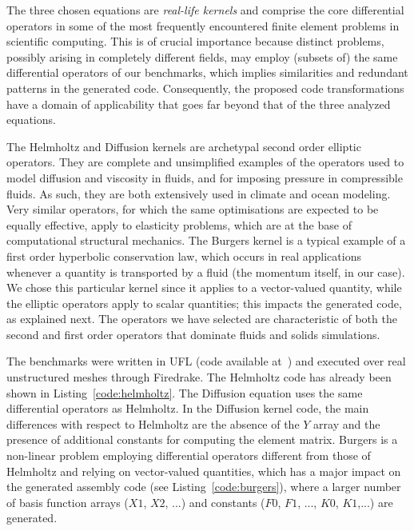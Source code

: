 The three chosen equations are \emph{real-life kernels} and comprise the core differential operators in some of the most frequently encountered finite element problems in scientific computing. This is of crucial importance because distinct problems, possibly arising in completely different fields, may employ (subsets of) the same differential operators of our benchmarks, which implies similarities and redundant patterns in the generated code. Consequently, the proposed code transformations have a domain of applicability that goes far beyond that of the three analyzed equations.

The Helmholtz and Diffusion kernels are archetypal second order elliptic operators. They are complete and unsimplified examples of the operators used to model diffusion and viscosity in fluids, and for imposing pressure in compressible fluids. As such, they are both extensively used in climate and ocean modeling. Very similar operators, for which the same optimisations are expected to be equally effective, apply to elasticity problems, which are at the base of computational structural mechanics. The Burgers kernel is a typical example of a first order hyperbolic conservation law, which occurs in real applications whenever a quantity is transported by a fluid (the momentum itself, in our case). We chose this particular kernel since it applies to a vector-valued quantity, while the elliptic operators apply to scalar quantities; this impacts the generated code, as explained next. The operators we have selected are characteristic of both the second and first order operators that dominate fluids and solids simulations.

The benchmarks were written in UFL (code available at~\citep{ufl-code-individual}) and executed over real unstructured meshes through Firedrake. The Helmholtz code has already been shown in Listing~\ref{code:helmholtz}. The Diffusion equation uses the same differential operators as Helmholtz. In the Diffusion kernel code, the main differences with respect to Helmholtz are the absence of the $Y$ array and the presence of additional constants for computing the element matrix. Burgers is a non-linear problem employing differential operators different from those of Helmholtz and relying on vector-valued quantities, which has a major impact on the generated assembly code (see Listing~\ref{code:burgers}), where a larger number of basis function arrays ($X1$, $X2$, ...) and constants ($F0$, $F1$, ..., $K0$, $K1$,...) are generated.

